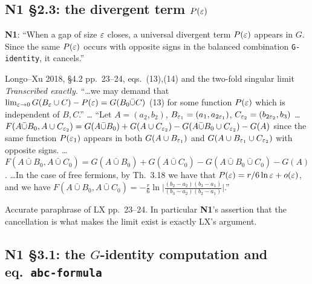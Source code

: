\documentclass[11pt]{article}
\newcommand{\NI}{\textbf{N1}}
\newcommand{\loc}[1]{{\small\texttt{#1}}}
\newcommand{\1}{\mathbf 1}
\begin{document}
\subsection{N1 \S2.3: the divergent term \texorpdfstring{$P(\varepsilon)$}{P(eps)}}
\NI: ``When a gap of size $\varepsilon$ closes, a universal divergent term $P(\varepsilon)$ appears in $G$.
Since the same $P(\varepsilon)$ occurs with opposite signs in the balanced combination \loc{G-identity}, it cancels.''
\begin{citedbox}{Longo--Xu 2018, \S4.2 pp.~23--24, eqs.~(13),(14) and the two-fold singular limit}
\emph{Transcribed exactly.} ``\dots we may demand that $\lim_{\varepsilon\to0}G(B_\varepsilon\cup C)-P(\varepsilon)=G(B_0\bar\cup C)$ (13)
for some function $P(\varepsilon)$ which is independent of $B,C$.'' \dots
``Let $A=(a_2,b_2)$, $B_{\varepsilon_1}=(a_1,a_{2\varepsilon_1})$, $C_{\varepsilon_2}=(b_{2\varepsilon_2},b_3)$ \dots
$F(A\bar\cup B_0,A\cup C_{\varepsilon_2})=G(A\bar\cup B_0)+G(A\cup C_{\varepsilon_2})-G(A\bar\cup B_0\cup C_{\varepsilon_2})-G(A)$
since the same function $P(\varepsilon_1)$ appears in both $G(A\cup B_{\varepsilon_1})$ and $G(A\cup B_{\varepsilon_1}\cup C_{\varepsilon_2})$
with opposite signs. \dots
$F(A\bar\cup B_0,A\bar\cup C_0)=G(A\bar\cup B_0)+G(A\bar\cup C_0)-G(A\bar\cup B_0\bar\cup C_0)-G(A)$.
\dots In the case of free fermions, by Th.~3.18 we have that $P(\varepsilon)=r/6\ln\varepsilon+o(\varepsilon)$, and we have
$F(A\bar\cup B_0,A\bar\cup C_0)=-\frac r6\ln\bigl|\frac{(b_2-a_2)(b_3-a_1)}{(b_3-a_2)(b_2-a_1)}\bigr|$.''\\[2pt]
\end{citedbox}
\begin{verdictok}
Accurate paraphrase of LX pp.~23--24. In particular \NI's assertion that the cancellation is what makes
the limit exist is exactly LX's argument.
\end{verdictok}

\subsection{N1 \S3.1: the \texorpdfstring{$G$}{G}-identity computation and eq.\ \loc{abc-formula}}
\end{document}
